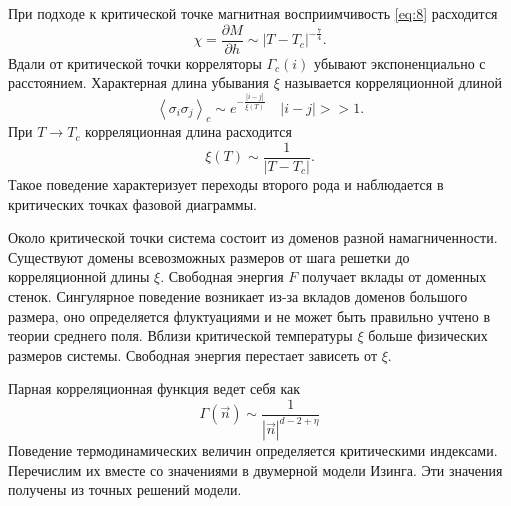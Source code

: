 \documentclass[a4paper,12pt]{article}
\theoremstyle{definition}
\theoremstyle{definition}
\theoremstyle{definition}
\begin{document}
При подходе к критической точке магнитная восприимчивость \eqref{eq:8} расходится
\begin{equation}
  \label{eq:29}
  \chi=\frac{\partial M}{\partial h}\sim \left|T-T_c \right|^{-\frac{7}{4}}.
\end{equation}
Вдали от критической точки корреляторы $\Gamma_c(i)$ убывают экспоненциально с расстоянием.
Характерная длина убывания $\xi$ называется корреляционной длиной 
\begin{equation}
  \label{eq:30}
  \left<\sigma_i\sigma_j\right>_c\sim e^{-\frac{\left|i-j\right|}{\xi(T)}}\quad \left|i-j\right|>>1.
\end{equation}
При $T\to T_c$ корреляционная длина расходится
\begin{equation}
  \label{eq:31}
  \xi(T)\sim \frac{1}{\left|T-T_c\right|}.
\end{equation}
Такое поведение характеризует переходы второго рода и наблюдается в критических точках фазовой диаграммы.

Около критической точки система состоит из доменов разной намагниченности. Существуют домены
всевозможных размеров от шага решетки до корреляционной длины $\xi$. Свободная энергия $F$ получает
вклады от доменных стенок. Сингулярное поведение возникает из-за вкладов доменов большого размера,
оно определяется флуктуациями и не может быть правильно учтено в теории среднего поля. Вблизи
критической температуры $\xi$ больше физических размеров системы. Свободная энергия перестает
зависеть от $\xi$.  

Парная корреляционная функция ведет себя как
\begin{equation}
  \label{eq:32}
  \Gamma(\vec n)\sim \frac{1}{\left|\vec n\right|^{d-2+\eta}}
\end{equation}
Поведение термодинамических величин определяется критическими индексами. Перечислим их вместе со
значениями в двумерной модели Изинга. Эти значения получены из точных решений модели. 
\begin{table}[h!tb]
\label{tab:diagrams}
\noindent  {}
\end{table}
\end{document}
